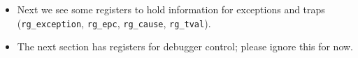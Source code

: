 \begin{frame}[fragile]
\begin{center}
\begin{minipage}{0.8\textwidth}
\begin{itemize}
    \hm
    \begin{minipage}{0.8\textwidth}

      {\tiny This may also seem a bit extravagant: in our sequential
      CPU, we are going to Fetch before LOAD/STORE and vice versa, so
      couldn't we share memory request/response FIFOs?  Yes, but we
      want to keep our interface identical to Fife, where the pipeline
      may simultanously Fetch and LOAD/STORE.}

    \end{minipage}

   \vspace*{1ex}

   \item Next we see some registers to hold information for exceptions
     and traps ({\tt rg\_exception}, {\tt rg\_epc}, {\tt rg\_cause},
     {\tt rg\_tval}).

   \vspace*{1ex}

   \item The next section has registers for debugger control; please
     ignore this for now.

  \end{itemize}

 \end{minipage}
\end{center}

\end{frame}



